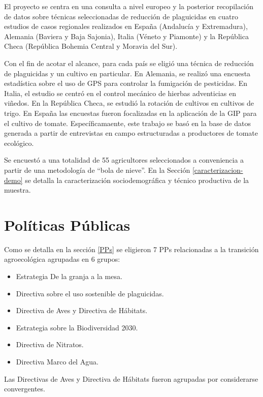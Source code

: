 \documentclass[a4paper, nobind]{templates/ociamthesis}
\providecommand{\tightlist}{%
  \setlength{\itemsep}{0pt}\setlength{\parskip}{0pt}}
\begin{document}
El proyecto se centra en una consulta a nivel europeo y la posterior recopilación de datos sobre técnicas seleccionadas de reducción de plaguicidas en cuatro estudios de casos regionales realizados en España (Andalucía y Extremadura), Alemania (Baviera y Baja Sajonia), Italia (Véneto y Piamonte) y la República Checa (República Bohemia Central y Moravia del Sur).

Con el fin de acotar el alcance, para cada país se eligió una técnica de reducción de plaguicidas y un cultivo en particular.
En Alemania, se realizó una encuesta estadística sobre el uso de GPS para controlar la fumigación de pesticidas.
En Italia, el estudio se centró en el control mecánico de hierbas adventicias en viñedos.
En la República Checa, se estudió la rotación de cultivos en cultivos de trigo.
En España las encuestas fueron focalizadas en la aplicación de la GIP para el cultivo de tomate.
Específicamaente, este trabajo se basó en la base de datos generada a partir de entrevistas en campo estructuradas a productores de tomate ecológico.

Se encuestó a una totalidad de 55 agricultores seleccionados a conveniencia a partir de una metodología de ``bola de nieve''.
En la Sección \ref{caracterizacion-demo} se detalla la caracterización sociodemográfica y técnico productiva de la muestra.

\hypertarget{poluxedticas-puxfablicas}{%
\section{Políticas Públicas}\label{poluxedticas-puxfablicas}}

Como se detalla en la sección \ref{PPs} se eligieron 7 PPs relacionadas a la transición agroecológica agrupadas en 6 grupos:

\begin{itemize}
\tightlist
\item
  Estrategia De la granja a la mesa.
\item
  Directiva sobre el uso sostenible de plaguicidas.
\item
  Directiva de Aves y Directiva de Hábitats.
\item
  Estrategia sobre la Biodiversidad 2030.
\item
  Directiva de Nitratos.
\item
  Directiva Marco del Agua.
\end{itemize}

Las Directivas de Aves y Directiva de Hábitats fueron agrupadas por considerarse convergentes.
\end{document}
